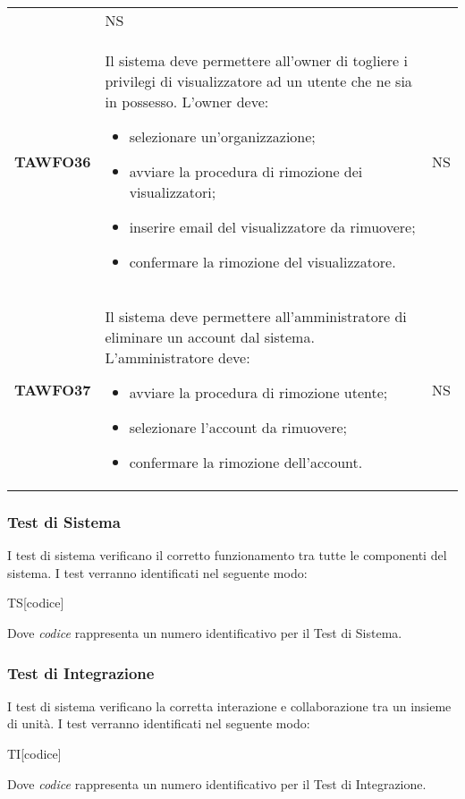 \documentclass[../piano-di-qualifica.tex]{subfiles}
\begin{document}
\begin{centering}
\begin{longtable}[H]{>{\centering\bfseries}m{3cm} >{}p{10cm} >{\centering\arraybackslash}m{3cm}}
\begin{itemize}
        \end{itemize}
        & NS \\
        TAWFO36      & Il sistema deve permettere all’owner di togliere i privilegi di visualizzatore ad un utente che ne sia in possesso. \newline
        L'owner deve:
        \begin{itemize}
         \item selezionare un'organizzazione;
         \item avviare la procedura di rimozione dei visualizzatori;
         \item inserire email del visualizzatore da rimuovere;
         \item confermare la rimozione del visualizzatore.
        \end{itemize}
        & NS \\
        TAWFO37      & Il sistema deve permettere all’amministratore di eliminare un account dal sistema. \newline
        L'amministratore deve:
        \begin{itemize}
         \item avviare la procedura di rimozione utente;
         \item selezionare l'account da rimuovere;
         \item confermare la rimozione dell'account.
        \end{itemize}
        & NS \\


      \end{longtable}
    \end{centering}
    \subsubsection{Test di Sistema}%
  \label{subs:sistema}
    I test di sistema verificano il corretto funzionamento tra tutte le componenti del sistema. I test verranno identificati nel seguente modo:
    \begin{center}
      TS[codice]
    \end{center}
    Dove \textit{codice} rappresenta un numero identificativo per il Test di Sistema.
  \subsubsection{Test di Integrazione}%
  \label{subs:integrazione}
    I test di sistema verificano la corretta interazione e collaborazione tra un insieme di unità. I test verranno identificati nel seguente modo:
    \begin{center}
      TI[codice]
    \end{center}
    Dove \textit{codice} rappresenta un numero identificativo per il Test di Integrazione.
\end{document}
